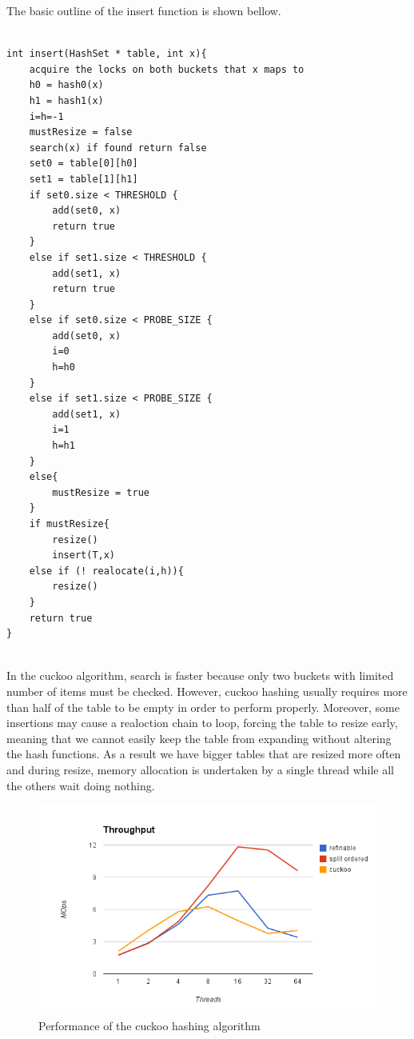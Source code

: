 The basic outline of the insert function is shown bellow.

\begin{lstlisting}[caption={Insert methos of the cuckoo algorithm}]

int insert(HashSet * table, int x){
	acquire the locks on both buckets that x maps to
	h0 = hash0(x)
	h1 = hash1(x)
	i=h=-1
	mustResize = false
	search(x) if found return false
	set0 = table[0][h0]
	set1 = table[1][h1]
	if set0.size < THRESHOLD {
		add(set0, x)
		return true
	}
	else if set1.size < THRESHOLD {
		add(set1, x)
		return true
	}
	else if set0.size < PROBE_SIZE {
		add(set0, x)
		i=0 
		h=h0
	}
	else if set1.size < PROBE_SIZE {
		add(set1, x)
		i=1
		h=h1
	}
	else{
		mustResize = true
	}
	if mustResize{
		resize()	
		insert(T,x)
	else if (! realocate(i,h)){
		resize()
	}
	return true
}
		

\end{lstlisting}


In the cuckoo algorithm, search is faster because only two buckets with limited number of items must be checked. However, cuckoo hashing usually requires more than half of the table to be empty in order to perform properly. Moreover, some insertions may cause a realoction chain to loop, forcing the table to resize early, meaning that we cannot easily keep the table from expanding without altering the hash functions. As a result we have bigger tables that are resized more often and during resize, memory allocation is undertaken by a single thread while all the others wait doing nothing.

\begin{figure}
 \centering
  \includegraphics[scale=0.5]{hashes_cuckoo_perf.png}
\caption{Performance of the cuckoo hashing algorithm}
\label{hashes_cuckoo_perf}
\end{figure}

